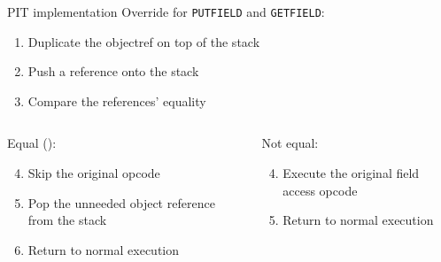 \begin{frame}{PIT implementation}
  Override  for \lstinline{PUTFIELD} and \lstinline{GETFIELD}:
  \begin{enumerate}
  \item<alert@2>
    Duplicate the objectref on top of the stack
  \item<alert@3>
    Push a  reference onto the stack
  \item<alert@4>
    Compare the references' equality
  \end{enumerate}
  \begin{columns}[t,totalwidth=0.6\textwidth]
    \begin{column}{0.45\textwidth}
      \alert<5-7>{Equal ():}
      \begin{enumerate}
        \setcounter{enumi}{3}
      \item<alert@5>
        Skip the original opcode
      \item<alert@6>
        Pop the unneeded object reference from the stack
      \item<alert@7>
        Return to normal execution
      \end{enumerate}
    \end{column}
    \begin{column}[]{0.45\textwidth}
      \alert<8-9>{Not equal:}
      \begin{enumerate}
        \setcounter{enumi}{3}
      \item<alert@8>
        Execute the original field access opcode
      \item<alert@9>
        Return to normal execution
      \end{enumerate}
    \end{column}
  \end{columns}
\end{frame}

